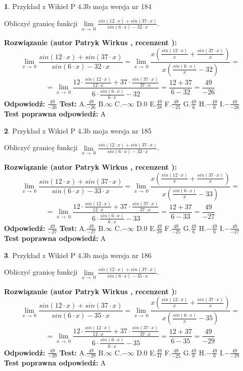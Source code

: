 \documentclass[12pt, a4paper]{article}
\theoremstyle{definition} %
\newtheorem{zad}{}
\newcommand{\zadStart}[1]{\begin{zad}#1\newline}
\newcommand{\zadStop}{\end{zad}}
\newcommand{\rozwStart}[2]{\noindent \textbf{Rozwiązanie (autor #1 , recenzent #2): }\newline}
\newcommand{\rozwStop}{\newline}
\newcommand{\odpStart}{\noindent \textbf{Odpowiedź:}\newline}
\newcommand{\odpStop}{\newline}
\newcommand{\testStart}{\noindent \textbf{Test:}\newline}
\newcommand{\testStop}{\newline}
\newcommand{\kluczStart}{\noindent \textbf{Test poprawna odpowiedź:}\newline}
\newcommand{\kluczStop}{\newline}
\begin{document}
\zadStart{Przykład z Wikieł P 4.3b moja wersja nr 184}


Obliczyć granicę funkcji $\lim\limits_{x\to\ 0}\frac{sin(12 \cdot x)+sin(37 \cdot x)}{sin(6 \cdot x)-32 \cdot x}$.
\zadStop
\rozwStart{Patryk Wirkus}{}
$$\lim\limits_{x\to\ 0}\frac{sin(12 \cdot x)+sin(37 \cdot x)}{sin(6 \cdot x)-32 \cdot x}=\lim\limits_{x\to\ 0}\frac{x(\frac{sin(12 \cdot x)}{x}+\frac{sin(37 \cdot x)}{x})}{x(\frac{sin(6 \cdot x)}{x}-32)}=$$
$$=\lim\limits_{x\to\ 0}\frac{12 \cdot \frac{sin(12 \cdot x)}{12 \cdot x}+37 \cdot \frac{sin(37 \cdot x)}{37 \cdot x}}{6 \cdot \frac{sin(6 \cdot x)}{6 \cdot x}-32}=\frac{12+37}{6-32} = \frac{49}{-26}$$
\rozwStop
\odpStart
$\frac{49}{-26}$
\odpStop
\testStart
A.$\frac{49}{-26}$
B.$\infty$
C.$-\infty$
D.$0$
E.$\frac{49}{38}$
F.$\frac{49}{-25}$
G.$\frac{49}{6}$
H.$-\frac{49}{6}$
I.$-\frac{49}{-26}$
\testStop
\kluczStart
A
\kluczStop



\zadStart{Przykład z Wikieł P 4.3b moja wersja nr 185}


Obliczyć granicę funkcji $\lim\limits_{x\to\ 0}\frac{sin(12 \cdot x)+sin(37 \cdot x)}{sin(6 \cdot x)-33 \cdot x}$.
\zadStop
\rozwStart{Patryk Wirkus}{}
$$\lim\limits_{x\to\ 0}\frac{sin(12 \cdot x)+sin(37 \cdot x)}{sin(6 \cdot x)-33 \cdot x}=\lim\limits_{x\to\ 0}\frac{x(\frac{sin(12 \cdot x)}{x}+\frac{sin(37 \cdot x)}{x})}{x(\frac{sin(6 \cdot x)}{x}-33)}=$$
$$=\lim\limits_{x\to\ 0}\frac{12 \cdot \frac{sin(12 \cdot x)}{12 \cdot x}+37 \cdot \frac{sin(37 \cdot x)}{37 \cdot x}}{6 \cdot \frac{sin(6 \cdot x)}{6 \cdot x}-33}=\frac{12+37}{6-33} = \frac{49}{-27}$$
\rozwStop
\odpStart
$\frac{49}{-27}$
\odpStop
\testStart
A.$\frac{49}{-27}$
B.$\infty$
C.$-\infty$
D.$0$
E.$\frac{49}{39}$
F.$\frac{49}{-25}$
G.$\frac{49}{6}$
H.$-\frac{49}{6}$
I.$-\frac{49}{-27}$
\testStop
\kluczStart
A
\kluczStop



\zadStart{Przykład z Wikieł P 4.3b moja wersja nr 186}


Obliczyć granicę funkcji $\lim\limits_{x\to\ 0}\frac{sin(12 \cdot x)+sin(37 \cdot x)}{sin(6 \cdot x)-35 \cdot x}$.
\zadStop
\rozwStart{Patryk Wirkus}{}
$$\lim\limits_{x\to\ 0}\frac{sin(12 \cdot x)+sin(37 \cdot x)}{sin(6 \cdot x)-35 \cdot x}=\lim\limits_{x\to\ 0}\frac{x(\frac{sin(12 \cdot x)}{x}+\frac{sin(37 \cdot x)}{x})}{x(\frac{sin(6 \cdot x)}{x}-35)}=$$
$$=\lim\limits_{x\to\ 0}\frac{12 \cdot \frac{sin(12 \cdot x)}{12 \cdot x}+37 \cdot \frac{sin(37 \cdot x)}{37 \cdot x}}{6 \cdot \frac{sin(6 \cdot x)}{6 \cdot x}-35}=\frac{12+37}{6-35} = \frac{49}{-29}$$
\rozwStop
\odpStart
$\frac{49}{-29}$
\odpStop
\testStart
A.$\frac{49}{-29}$
B.$\infty$
C.$-\infty$
D.$0$
E.$\frac{49}{41}$
F.$\frac{49}{-25}$
G.$\frac{49}{6}$
H.$-\frac{49}{6}$
I.$-\frac{49}{-29}$
\testStop
\kluczStart
A
\kluczStop
\end{document}
